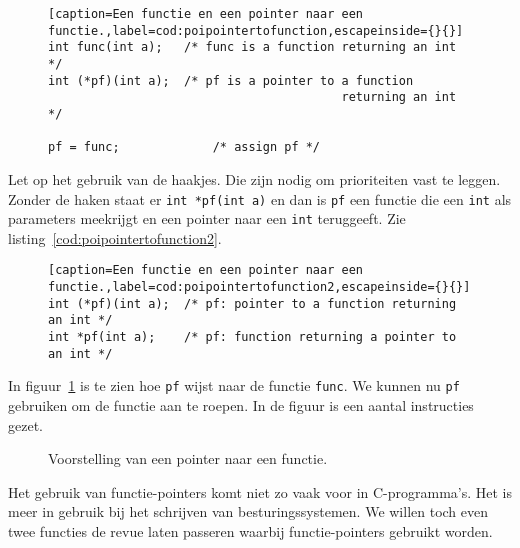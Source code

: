 \begin{figure}[!ht]
\begin{lstlisting}[caption=Een functie en een pointer naar een functie.,label=cod:poipointertofunction,escapeinside={}{}]
int func(int a);   /* func is a function returning an int */
int (*pf)(int a);  /* pf is a pointer to a function
                                         returning an int */

pf = func;             /* assign pf */
\end{lstlisting}
\end{figure}

Let op het gebruik van de haakjes. Die zijn nodig om prioriteiten vast te leggen. Zonder de haken staat er \texttt{int *pf(int a)} en dan is \texttt{pf} een functie die een \texttt{int} als parameters meekrijgt en een pointer naar een \texttt{int} teruggeeft. Zie listing~\ref{cod:poipointertofunction2}.

\begin{figure}[H]
\begin{lstlisting}[caption=Een functie en een pointer naar een functie.,label=cod:poipointertofunction2,escapeinside={}{}]
int (*pf)(int a);  /* pf: pointer to a function returning an int */
int *pf(int a);    /* pf: function returning a pointer to an int */
\end{lstlisting}
\end{figure}

In figuur~\ref{fig:poipointertofunction} is te zien hoe \texttt{pf} wijst naar de functie \texttt{func}. We kunnen nu \texttt{pf} gebruiken om de functie aan te roepen. In de figuur is een aantal instructies gezet.

\begin{figure}[!ht]
\centering
{}
\caption{Voorstelling van een pointer naar een functie.}
\label{fig:poipointertofunction}
\end{figure}

Het gebruik van functie-pointers komt niet zo vaak voor in C-programma's. Het is meer in gebruik bij het schrijven van besturingssystemen. We willen toch even twee functies de revue laten passeren waarbij functie-pointers gebruikt worden.

